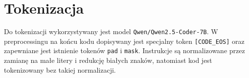 \section{Tokenizacja }
\label{sec:tokenizacja}

Do tokenizacji wykorzystywany jest model \texttt{Qwen/\allowbreak{}Qwen2.5-\allowbreak{}Coder-\allowbreak{}7B}. W preprocessingu na końcu kodu dopisywany jest specjalny token \texttt{[CODE\_EOS]} oraz zapewniane jest istnienie tokenów \texttt{pad} i \texttt{mask}. Instrukcje są normalizowane przez zamianę na małe litery i redukcję białych znaków, natomiast kod jest tokenizowany bez takiej normalizacji.

